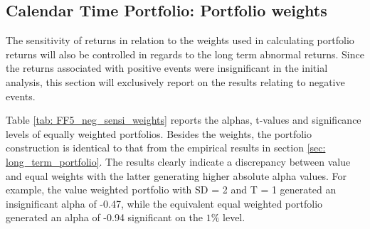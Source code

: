 \subsection{Calendar Time Portfolio: Portfolio weights}

The sensitivity of returns in relation to the weights used in calculating portfolio returns will also be controlled in regards to the long term abnormal returns. Since the returns associated with positive events were insignificant in the initial analysis, this section will exclusively report on the results relating to negative events. 

Table \ref{tab: FF5_neg_sensi_weights} reports the alphas, t-values and significance levels of equally weighted portfolios. Besides the weights, the portfolio construction is identical to that from the empirical results in section \ref{sec: long_term_portfolio}. The results clearly indicate a discrepancy between value and equal weights with the latter generating higher absolute alpha values. For example, the value weighted portfolio with SD = 2 and T = 1 generated an insignificant alpha of -0.47, while the equivalent equal weighted portfolio generated an alpha of -0.94 significant on the $1\%$ level.   

